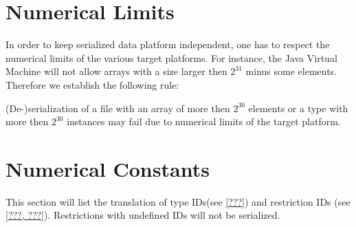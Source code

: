 \section{Numerical Limits}

In order to keep serialized data platform independent, one has to respect the numerical limits of the various target platforms. For instance, the Java Virtual Machine will not allow arrays with a size larger then $2^31$ minus some elements. Therefore we establish the following rule:

(De-)serialization of a file with an array of more then $2^30$ elements or a type with more then $2^30$ instances may fail due to numerical limits of the target platform.

\section{Numerical Constants}
This section will list the translation of type IDs(see \ref{???}) and restriction IDs (see \ref{???, ???}). Restrictions with undefined IDs will not be serialized.

